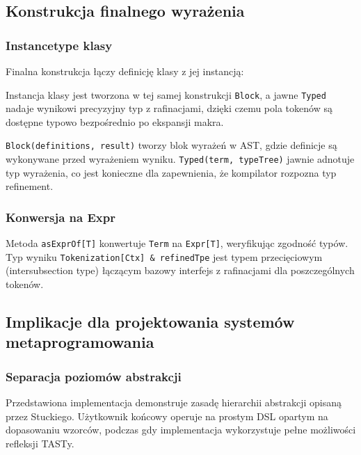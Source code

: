 \subsection{Konstrukcja finalnego wyrażenia}\label{subsec:konstrukcja-finalnego-wyrazenia}

\subsubsection{Instancetype klasy}\label{subsubsec:instancetype-klasy}

Finalna konstrukcja łączy definicję klasy z jej instancją:

Instancja klasy jest tworzona w tej samej konstrukcji \texttt{Block}, a jawne \texttt{Typed} nadaje wynikowi precyzyjny typ z rafinacjami, dzięki czemu pola tokenów są dostępne typowo bezpośrednio po ekspansji makra.

\texttt{Block(definitions, result)} tworzy blok wyrażeń w AST, gdzie definicje są wykonywane przed wyrażeniem wyniku. \texttt{Typed(term, typeTree)} jawnie adnotuje typ wyrażenia, co jest konieczne dla zapewnienia, że kompilator rozpozna typ refinement.

\subsubsection{Konwersja na Expr}\label{subsubsec:konwersja-na-expr}

Metoda \texttt{asExprOf[T]} konwertuje \texttt{Term} na \texttt{Expr[T]}, weryfikując zgodność typów.
Typ wyniku \texttt{Tokenization[Ctx] \& refinedTpe} jest typem przecięciowym (intersubsection type) łączącym bazowy interfejs z rafinacjami dla poszczególnych tokenów.

\subsection{Implikacje dla projektowania systemów metaprogramowania}\label{subsec:implikacje-dla-projektowania-systemow-metaprogramowania}

\subsubsection{Separacja poziomów abstrakcji}\label{subsubsec:separacja-poziomow-abstrakcji}

Przedstawiona implementacja demonstruje zasadę hierarchii abstrakcji opisaną przez Stuckiego.
Użytkownik końcowy operuje na prostym DSL opartym na dopasowaniu wzorców, podczas gdy implementacja wykorzystuje pełne możliwości refleksji TASTy.

